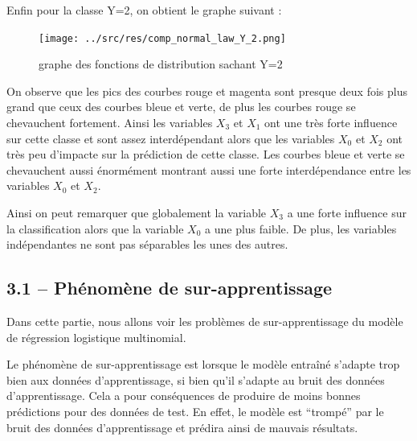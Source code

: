 \documentclass[
]{article}
\begin{document}
\newpage{}

Enfin pour la classe Y=2, on obtient le graphe suivant :

\begin{figure}
\centering
\texttt{[image: ../src/res/comp\_normal\_law\_Y\_2.png]}
\caption{graphe des fonctions de distribution sachant Y=2}
\end{figure}

On observe que les pics des courbes rouge et magenta sont presque deux
fois plus grand que ceux des courbes bleue et verte, de plus les courbes
rouge se chevauchent fortement. Ainsi les variables \(X_3\) et \(X_1\)
ont une très forte influence sur cette classe et sont assez
interdépendant alors que les variables \(X_0\) et \(X_2\) ont très peu
d'impacte sur la prédiction de cette classe. Les courbes bleue et verte
se chevauchent aussi énormément montrant aussi une forte interdépendance
entre les variables \(X_0\) et \(X_2\).

Ainsi on peut remarquer que globalement la variable \(X_3\) a une forte
influence sur la classification alors que la variable \(X_0\) a une plus
faible. De plus, les variables indépendantes ne sont pas séparables les
unes des autres.

\hypertarget{phuxe9nomuxe8ne-de-sur-apprentissage}{%
\subsection{3.1 -- Phénomène de
sur-apprentissage}\label{phuxe9nomuxe8ne-de-sur-apprentissage}}

Dans cette partie, nous allons voir les problèmes de sur-apprentissage
du modèle de régression logistique multinomial.

Le phénomène de sur-apprentissage est lorsque le modèle entraîné
s'adapte trop bien aux données d'apprentissage, si bien qu'il s'adapte
au bruit des données d'apprentissage. Cela a pour conséquences de
produire de moins bonnes prédictions pour des données de test. En effet,
le modèle est ``trompé'' par le bruit des données d'apprentissage et
prédira ainsi de mauvais résultats.
\end{document}
